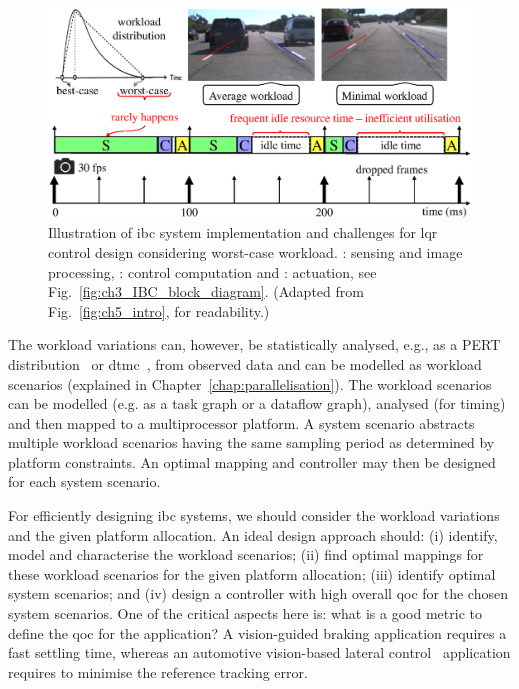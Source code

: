 \begin{figure}[tb]
\centerline{
    \includegraphics[width=\textwidth]{images/workload_IBC.eps}
    }
    \caption{Illustration of \gls{ibc} system implementation and challenges for \gls{lqr} control design considering worst-case workload. \taskS: sensing and image processing, \taskC: control computation and \taskA: actuation, see Fig.~\ref{fig:ch3_IBC_block_diagram}. (Adapted from Fig.~\ref{fig:ch5_intro}, for readability.)}
    \label{fig:ch3_workload_IBC}
    \vspace{-2em}
\end{figure}

The workload variations can, however, be statistically analysed, e.g., as a PERT distribution~\cite{adyanthaya2014robustness} or \gls{dtmc}~\cite{welton2005estimation}, from observed data and can be modelled as workload scenarios (explained in Chapter~\ref{chap:parallelisation}).
 The workload scenarios can be modelled (e.g. as a task graph or a dataflow graph), analysed (for timing) and then mapped to a multiprocessor platform. 
 A system scenario abstracts multiple workload scenarios having the same sampling period as determined by platform constraints.
 An optimal mapping and controller may then be designed for each system scenario. 
 
For efficiently designing \gls{ibc} systems, we should consider the workload variations and the given platform allocation. 
An ideal design approach should: (i) identify, model and characterise the workload scenarios; (ii) find optimal mappings for these workload scenarios for the given platform allocation; (iii) identify optimal system scenarios; and (iv) design a controller with high overall \gls{qoc} for the chosen system scenarios.
One of the critical aspects here is: what is a good metric to define the \gls{qoc} for the application? 
A vision-guided braking application requires a fast settling time, whereas an automotive vision-based lateral control~\cite{taylor1999comparative} application requires to minimise the reference tracking error.

